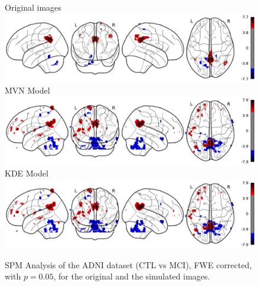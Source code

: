 \begin{figure}
	\centering
	Original \adnipet{} images\\
	\includegraphics[width=\linewidth]{Graphics/ch8/NORvsMCI_Orig_glass}\\
	\ac{MVN} Model\\
	\includegraphics[width=\linewidth]{Graphics/ch8/NORvsMCI_MVN_glass}\\
	\ac{KDE} Model\\
	\includegraphics[width=\linewidth]{Graphics/ch8/NORvsMCI_KDE_glass}
	\caption[\acs{SPM} Analysis of the \acs{ADNI} dataset (\acs{CTL} vs \acs{MCI}).]{\ac{SPM} Analysis of the \acs{ADNI} dataset (\ac{CTL} vs \ac{MCI}), \ac{FWE} corrected, with $p=0.05$, for the original and the simulated images.}
	\label{fig:spmNORvsMCI}
\end{figure}


